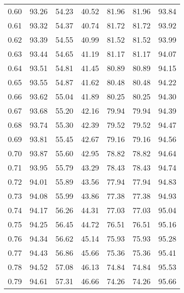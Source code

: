 \begin{tabular}{|c|c|c|c|c|c|c|}
      0.60 &     93.26 &     54.23 &      40.52 &   81.96 &      81.96 &         93.84 \\
      0.61 &     93.32 &     54.37 &      40.74 &   81.72 &      81.72 &         93.92 \\
      0.62 &     93.39 &     54.55 &      40.99 &   81.52 &      81.52 &         93.99 \\
      0.63 &     93.44 &     54.65 &      41.19 &   81.17 &      81.17 &         94.07 \\
      0.64 &     93.51 &     54.81 &      41.45 &   80.89 &      80.89 &         94.15 \\
      0.65 &     93.55 &     54.87 &      41.62 &   80.48 &      80.48 &         94.22 \\
      0.66 &     93.62 &     55.04 &      41.89 &   80.25 &      80.25 &         94.30 \\
      0.67 &     93.68 &     55.20 &      42.16 &   79.94 &      79.94 &         94.39 \\
      0.68 &     93.74 &     55.30 &      42.39 &   79.52 &      79.52 &         94.47 \\
      0.69 &     93.81 &     55.45 &      42.67 &   79.16 &      79.16 &         94.56 \\
      0.70 &     93.87 &     55.60 &      42.95 &   78.82 &      78.82 &         94.64 \\
      0.71 &     93.95 &     55.79 &      43.29 &   78.43 &      78.43 &         94.74 \\
      0.72 &     94.01 &     55.89 &      43.56 &   77.94 &      77.94 &         94.83 \\
      0.73 &     94.08 &     55.99 &      43.86 &   77.38 &      77.38 &         94.93 \\
      0.74 &     94.17 &     56.26 &      44.31 &   77.03 &      77.03 &         95.04 \\
      0.75 &     94.25 &     56.45 &      44.72 &   76.51 &      76.51 &         95.16 \\
      0.76 &     94.34 &     56.62 &      45.14 &   75.93 &      75.93 &         95.28 \\
      0.77 &     94.43 &     56.86 &      45.66 &   75.36 &      75.36 &         95.41 \\
      0.78 &     94.52 &     57.08 &      46.13 &   74.84 &      74.84 &         95.53 \\
      0.79 &     94.61 &     57.31 &      46.66 &   74.26 &      74.26 &         95.66 \\

\end{tabular}
